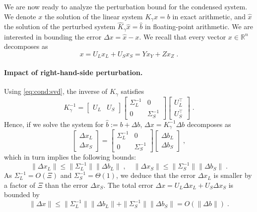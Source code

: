 We are now ready to analyze the perturbation bound for the condensed system.
We denote $x$ the solution of the linear system $K_\gamma x = b$
in exact arithmetic, and $\widehat{x}$ the solution of
the perturbed system $\widehat{K}_\gamma \widehat{x} = \widehat{b}$
in floating-point arithmetic. We are interested in bounding
the error $\Delta x = \widehat{x} - x$. We
recall that every vector $x \in \mathbb{R}^n$ decomposes as
\begin{equation}
  x = U_L x_L + U_S x_S = Y x_Y + Z x_Z \; .
\end{equation}

\paragraph{Impact of right-hand-side perturbation.}
Using \eqref{eq:cond:svd}, the inverse of
$K_\gamma$ satisfies
\begin{equation}
  \label{eq:cond:inversecondensed}
  K_\gamma^{-1}  = \begin{bmatrix} U_L & U_S \end{bmatrix}
  \begin{bmatrix}
    \Sigma_L^{-1} & 0 \\ 0 & \Sigma_S^{-1}
  \end{bmatrix}
  \begin{bmatrix}
    U_L^\top \\ U_S^\top
  \end{bmatrix}
  \; .
\end{equation}
Hence, if we solve the system for $\widehat{b} := b + \Delta b$,
$\Delta x = K_\gamma^{-1} \Delta b$ decomposes as
\begin{equation}
  \begin{bmatrix}
    \Delta x_L \\ \Delta x_S
  \end{bmatrix}
  =
  \begin{bmatrix}
    \Sigma_L^{-1} & 0 \\ 0 & \Sigma_S^{-1}
  \end{bmatrix}
  \begin{bmatrix}
    \Delta b_L \\ \Delta b_S
  \end{bmatrix}
  \; ,
\end{equation}
which in turn implies the following bounds:
\begin{equation}
  \label{eq:cond:rhserror}
     \| \Delta x_L \| \leq \| \Sigma_L^{-1} \| \| \Delta b_L \| \; ,\quad
    \| \Delta x_S \| \leq \| \Sigma_S^{-1} \| \| \Delta b_S \| \; .
\end{equation}
As $\Sigma_L^{-1} = O(\Xi)$ and $\Sigma_S^{-1} = \Theta(1)$,
we deduce that the error $\Delta x_L$ is smaller by a factor
of $\Xi$ than the error $\Delta x_S$. The total error
$\Delta x = U_L \Delta x_L + U_S \Delta x_S$ is bounded by
\begin{equation}
  \label{eq:cond:rhserrorfull}
  \| \Delta x \|
  \leq  \| \Sigma_L^{-1} \| \| \Delta b_L \| + \| \Sigma_S^{-1} \| \| \Delta b_S \| =
  O(\|\Delta b \|) \; .
\end{equation}

